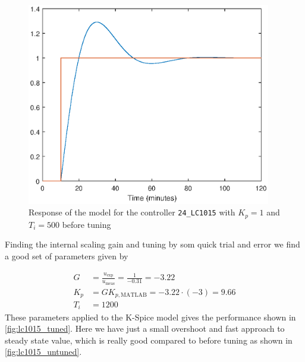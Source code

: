 \begin{figure}[ht!]
	\centering
	\includegraphics[width=0.95\textwidth]{fig/identification/lc1015_simulation_before.eps}
	\caption{Response of the model for the controller \texttt{24\_LC1015} with $K_p = 1$ and $T_i = 500$ before tuning}
	\label{fig:lc1015_simulation_untuned}
\end{figure}

Finding the internal scaling gain and tuning by som quick trial and error we find a good set of parameters given by

\begin{equation}
	\begin{aligned}
		G &= \frac{u_{\text{exp}}}{u_{\text{meas}}} = \frac{1}{-0.31} = -3.22 \\
		K_p &= GK_{p,\text{MATLAB}} = -3.22\cdot(-3) = 9.66\\
		T_i &= 1200
	\end{aligned}
\end{equation}
These parameters applied to the K-Spice model gives the performance shown in \autoref{fig:lc1015_tuned}. Here we have just a small overshoot and fast approach to steady state value, which is really good compared to before tuning as shown in \autoref{fig:lc1015_untuned}. 

